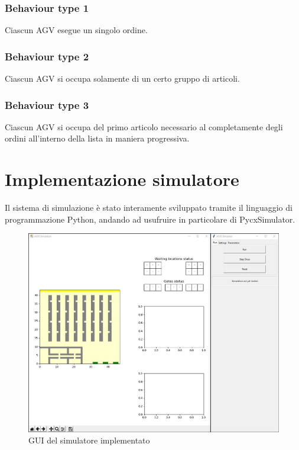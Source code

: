 \documentclass[12pt]{article}
\begin{document}
\subsubsection{Behaviour type 1}
Ciascun AGV esegue un singolo ordine.
\subsubsection{Behaviour type 2}
Ciascun AGV si occupa solamente di un certo gruppo di articoli.
\subsubsection{Behaviour type 3}
Ciascun AGV si occupa del primo articolo necessario al completamente degli ordini all'interno della lista in maniera progressiva.

\newpage
\section{Implementazione simulatore} 
Il sistema di simulazione è stato interamente sviluppato tramite il linguaggio di programmazione Python, andando ad usufruire in particolare di PycxSimulator.

\begin{figure}[h]
\centering
\includegraphics[width=1\textwidth,height=\textheight,keepaspectratio]{Figures/GUI/Simulatore.jpg}
\caption[GUI del simulatore implementato]{GUI del simulatore implementato}
\label{fig:Simulatore}
\end{figure}
\end{document}
